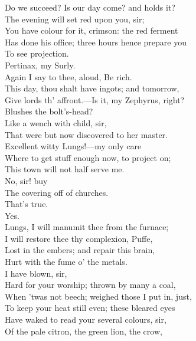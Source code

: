 \documentclass[a4paper,oneside,12pt]{memoir}
\begin{document}
\begin{drama*}
Do we succeed? Is our day come? and holds it?\\
\facespeaks The evening will set red upon you, sir;\\
You have colour for it, crimson: the red ferment\\
Has done his office; three hours hence prepare you\\
To see projection.\\
\mammonspeaks {} Pertinax, my Surly.\\
Again I say to thee, aloud, Be rich.\\
This day, thou shalt have ingots; and tomorrow,\\
Give lords th' affront.---Is it, my Zephyrus, right?\\
Blushes the bolt's-head?\\
\facespeaks {} Like a wench with child, sir,\\
That were but now discovered to her master.\\
\mammonspeaks Excellent witty Lungs!---my only care\\
Where to get stuff enough now, to project on;\\
This town will not half serve me.\\
\facespeaks {} No, sir! buy\\
The covering off of churches.\\
\mammonspeaks {} That's true.\\
\facespeaks {} Yes.\\
\mammonspeaks Lungs, I will manumit thee from the furnace;\\
I will restore thee thy complexion, Puffe,\\
Lost in the embers; and repair this brain,\\
Hurt with the fume o' the metals.\\
\facespeaks {} I have blown, sir,\\
Hard for your worship; thrown by many a coal,\\
When 'twas not beech; weighed those I put in, just,\\
To keep your heat still even; these bleared eyes\\
Have waked to read your several colours, sir,\\
Of the pale citron, the green lion, the crow,\\

\end{drama*}
\end{document}
